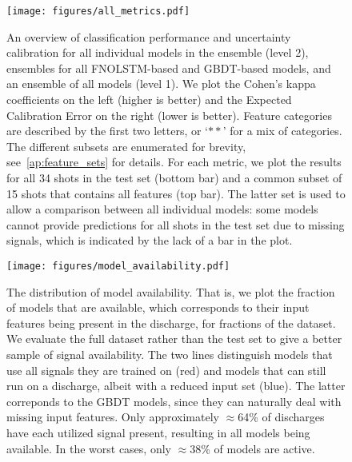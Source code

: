 \begin{figure}[t]
\begin{center}\texttt{[image: figures/all\_metrics.pdf]}\end{center}
    \caption{An overview of classification performance and uncertainty calibration for all individual models in the ensemble (level 2), ensembles for all FNOLSTM-based and GBDT-based models, and an ensemble of all models (level 1). We plot the Cohen's kappa coefficients on the left (higher is better) and the Expected Calibration Error on the right (lower is better). Feature categories are described by the first two letters, or `$\ast\ast$' for a mix of categories. The different subsets are enumerated for brevity, see~\ref{ap:feature_sets} for details. For each metric, we plot the results for all 34 shots in the test set (bottom bar) and a common subset of 15 shots that contains all features (top bar). The latter set is used to allow a comparison between all individual models: some models cannot provide predictions for all shots in the test set due to missing signals, which is indicated by the lack of a bar in the plot.} %
    \label{fig:all_metrics}%
\end{figure}

\begin{figure}[t]
\begin{center}\texttt{[image: figures/model\_availability.pdf]}\end{center}
    \caption{The distribution of model availability. That is, we plot the fraction of models that are available, which corresponds to their input features being present in the discharge, for fractions of the dataset. We evaluate the full dataset rather than the test set to give a better sample of signal availability.  The two lines distinguish models that use all signals they are trained on (red) and models that can still run on a discharge, albeit with a reduced input set (blue). The latter correponds to the GBDT models, since they can naturally deal with missing input features. Only approximately $\approx$64\% of discharges have each utilized signal present, resulting in all models being available. In the worst cases, only $\approx$38\% of models are active.}
    \label{fig:availability}%
\end{figure}




